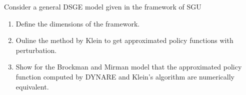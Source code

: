 Consider a general DSGE model given in the framework of SGU
\begin{enumerate}
    \item Define the dimensions of the framework.

    \item Ouline the method by Klein to get approximated policy functions with perturbation.

    \item Show for the Brockman and Mirman model that the approximated policy function computed by DYNARE and Klein's algorithm are numerically equivalent.
\end{enumerate}